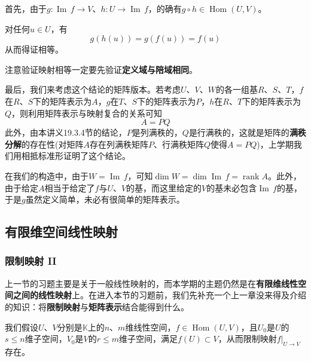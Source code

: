 \documentclass[a4paper,UTF8,fontset=windows,AutoFakeBold]{ctexart}
\DeclareMathOperator{\rank}{rank}
\DeclareMathOperator{\im}{Im\,}
\DeclareMathOperator{\Hom}{Hom}
\newcommand*{\note}{\noindent *}
\begin{document}
\begin{enumerate}
\begin{itemize}
        首先，由于$g:\im f\to V$、$h:U\to\im f$，的确有$g\circ h\in\Hom(U,V)$。

        对任何$u\in U$，有
        $$g(h(u))=g(f(u))=f(u)$$
        从而得证相等。

        \note 注意验证映射相等一定要先验证\textbf{定义域与陪域相同}。
    \end{itemize}

    最后，我们来考虑这个结论的矩阵版本。若考虑$U$、$V$、$W$的各一组基$R$、$S$、$T$，$f$在$R$、$S$下的矩阵表示为$A$，$g$在$T$、$S$下的矩阵表示为$P$，$h$在$R$、$T$下的矩阵表示为$Q$，则利用矩阵表示与映射复合的关系可知
    $$A=PQ$$
    此外，由本讲义19.3.4节的结论，$P$是列满秩的，$Q$是行满秩的，这就是矩阵的\textbf{满秩分解}的存在性(对矩阵$A$存在列满秩矩阵$P$、行满秩矩阵$Q$使得$A=PQ$)，上学期我们用相抵标准形证明了这个结论。

    \note 在我们的构造中，由于$W=\im f$，可知$\dim W=\dim\im f=\rank A$。此外，由于给定$A$相当于给定了$f$与$U$、$V$的基，而这里给定的$V$的基未必包含$\im f$的基，于是$g$虽然定义简单，未必有很简单的矩阵表示。
\end{enumerate}

\subsection{有限维空间线性映射}
\subsubsection{限制映射 II}
上一节的习题主要是关于一般线性映射的，而本学期的主题仍然是在\textbf{有限维线性空间之间的线性映射}上。在进入本节的习题前，我们先补充一个上一章没来得及介绍的知识：将\textbf{限制映射}与\textbf{矩阵表示}结合能得到什么。

我们假设$U$、$V$分别是$\mathbb{K}$上的$n$、$m$维线性空间，$f\in\Hom(U,V)$，且$U_0$是$U$的$s\le n$维子空间，$V_0$是$V$的$r\le m$维子空间，满足$f(U)\subset V$，从而限制映射$f|_{U\to V}$存在。

\
\end{document}
